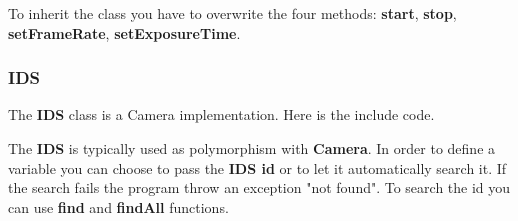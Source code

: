 To inherit the class you have to overwrite the four methods:
\textbf{start}, \textbf{stop}, \textbf{setFrameRate},
\textbf{setExposureTime}.

\begin{Shaded}
\begin{Highlighting}[]
\NormalTok{:}
  \NormalTok{;}
  \NormalTok{;}
  \NormalTok{;}
  \NormalTok{;}
\NormalTok{\};}
\end{Highlighting}
\end{Shaded}

\hypertarget{ids}{%
\subsubsection{IDS}\label{ids}}

The \textbf{IDS} class is a Camera implementation. Here is the include
code.

\begin{Shaded}
\begin{Highlighting}[]
 
\end{Highlighting}
\end{Shaded}

The \textbf{IDS} is typically used as polymorphism with \textbf{Camera}.
In order to define a variable you can choose to pass the \textbf{IDS id}
or to let it automatically search it. If the search fails the program
throw an exception "not found". To search the id you can use
\textbf{find} and \textbf{findAll} functions.

\begin{Shaded}
\begin{Highlighting}[]
\NormalTok{make\_shared\textless{}PAT::Camera::IDS\textgreater{}(IDS::findAll(){-}\textgreater{}uci[}\NormalTok{].dwCameraID);}
\end{Highlighting}
\end{Shaded}

